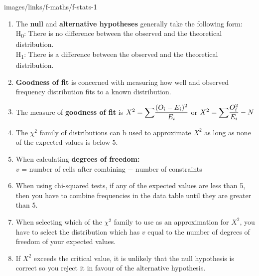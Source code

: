 \documentclass[fleqn]{article}
\begin{document}




\begin{keyinformation}{images/links/f-maths/f-stats-1}
    \begin{enumerate}
        \item The \textbf{null} and \textbf{alternative hypotheses} generally take the following form:        \\
            H\textsubscript{0}: There is no difference between the observed and the theoretical distribution. \\
            H\textsubscript{1}: There is a difference between the observed and the theoretical distribution.
        \item \textbf{Goodness of fit} is concerned with measuring how well and observed frequency distribution fits to a known distribution.
        \item The measure of \textbf{goodness of fit} is $X^2={\mathlarger{\sum}} \dfrac{(O_i-E_i)^2}{E_i}$ or $X^2={\mathlarger{\sum}} \dfrac{O_i^2}{E_i}-N$
        \item The $\chi^2$ family of distributions can b used to approximate $X^2$ as long as none of the expected values is below 5.
        \item When calculating \textbf{degrees of freedom:} \vspace{2mm}\\
            $v$ = number of cells after combining $-$ number of constraints \vspace{1mm}
        \item When using chi-squared tests, if any of the expected values are less than 5, then you have to combine frequencies in the data table until they are greater than 5.
        \item When selecting which of the $\chi^2$ family to use as an approximation for $X^2$, you have to select the distribution which has $v$ equal to the number of degrees of freedom of your expected values.
        \item If $X^2$ exceeds the critical value, it is unlikely that the null hypothesis is correct so you reject it in favour of the alternative hypothesis.
    \end{enumerate}
\end{keyinformation}

\newpage
\pagestyle{attribution}
\end{document}
